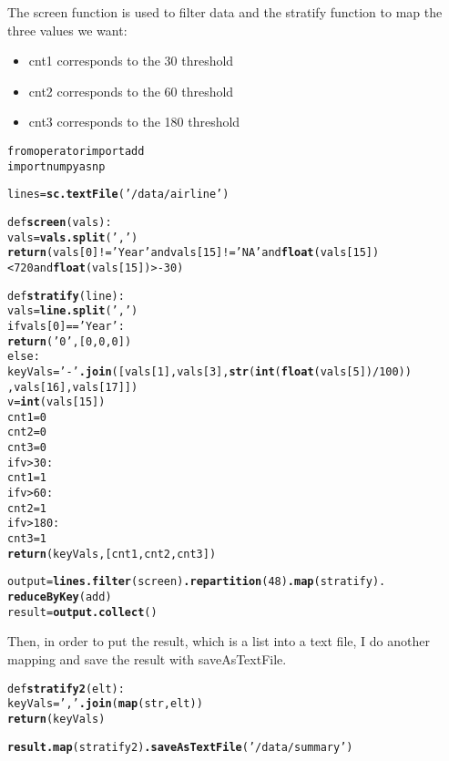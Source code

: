 \documentclass{llncs}\usepackage[]{graphicx}\usepackage[]{color}
\makeatletter
\newcommand{\hlstr}[1]{\textcolor[rgb]{0.192,0.494,0.8}{#1}}%
\newcommand{\hlkwd}[1]{\textcolor[rgb]{0.737,0.353,0.396}{\textbf{#1}}}%
\newenvironment{kframe}{%
 \def\at@end@of@kframe{}%
 \ifinner\ifhmode%
  \def\at@end@of@kframe{\end{minipage}}%
  \begin{minipage}{\columnwidth}%
 \fi\fi%
 \def\FrameCommand##1{\hskip\@totalleftmargin \hskip-\fboxsep
 \colorbox{shadecolor}{##1}\hskip-\fboxsep
     \hskip-\linewidth \hskip-\@totalleftmargin \hskip\columnwidth}%
 \MakeFramed {\advance\hsize-\width
   \@totalleftmargin\z@ \linewidth\hsize
   \@setminipage}}%
 {\par\unskip\endMakeFramed%
 \at@end@of@kframe}
\newenvironment{knitrout}{}{} %
\makeatother
\begin{document}
The screen function is used to filter data and the stratify function to map the three values we want: 
\begin{itemize}
\item cnt1 corresponds to the 30 threshold 
\item cnt2 corresponds to the 60 threshold
\item cnt3 corresponds to the 180 threshold
\end{itemize}
\begin{knitrout}
\color{fgcolor}\begin{kframe}
\begin{alltt}
from operator import add
import numpy as np

lines = \hlkwd{sc.textFile}(\hlstr{'/data/airline'})

def \hlkwd{screen}(vals):
    vals = \hlkwd{vals.split}(\hlstr{','})
    \hlkwd{return}(vals[0] != \hlstr{'Year'} and vals[15] != \hlstr{'NA'} and \hlkwd{float}(vals[15]) 
           < 720 and \hlkwd{float}(vals[15]) > -30 )


def \hlkwd{stratify}(line):
    vals = \hlkwd{line.split}(\hlstr{','})
    if vals[0] == \hlstr{'Year'}:
        \hlkwd{return}(\hlstr{'0'}, [0,0,0])
    else:
        keyVals = \hlstr{'-'}\hlkwd{.join}([vals[1],vals[3],\hlkwd{str}(\hlkwd{int}(\hlkwd{float}(vals[5])/100))
                            ,vals[16],vals[17]])
        v=\hlkwd{int}(vals[15])
        cnt1=0
        cnt2=0
        cnt3=0
        if v>30:
            cnt1=1   
            if v>60: 
                cnt2=1 
                if v>180:
                    cnt3=1 
        \hlkwd{return}(keyVals, [cnt1,cnt2,cnt3])



output = \hlkwd{lines.filter}(screen)\hlkwd{.repartition}(48)\hlkwd{.map}(stratify).
\hlkwd{reduceByKey}(add)
result = \hlkwd{output.collect}()
\end{alltt}
\end{kframe}
\end{knitrout}
Then, in order to put the result, which is a list into a text file, I do another mapping and save the result with saveAsTextFile.
\begin{knitrout}
\color{fgcolor}\begin{kframe}
\begin{alltt}
def \hlkwd{stratify2}(elt):
    keyVals = \hlstr{','}\hlkwd{.join}(\hlkwd{map}(str,elt))
    \hlkwd{return}(keyVals)

\hlkwd{result.map}(stratify2)\hlkwd{.saveAsTextFile}(\hlstr{'/data/summary'})
\end{alltt}
\end{kframe}
\end{knitrout}
\end{document}

